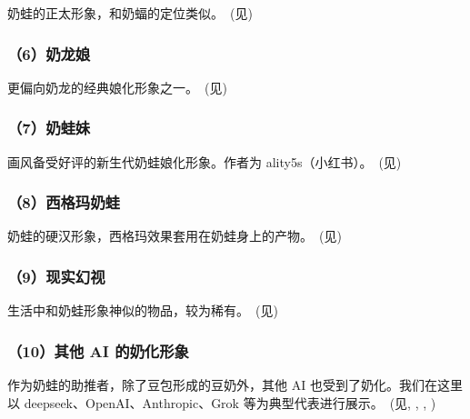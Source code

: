 奶蛙的正太形象，和奶蝠的定位类似。~(见)

\clearpage
\subsubsection{（6）奶龙娘}



更偏向奶龙的经典娘化形象之一。~(见)

\subsubsection{（7）奶蛙妹}



画风备受好评的新生代奶蛙娘化形象。作者为 ality5s（小红书）。~(见)

\subsubsection{（8）西格玛奶蛙}



奶蛙的硬汉形象，西格玛效果套用在奶蛙身上的产物。~(见)

\clearpage
\subsubsection{（9）现实幻视}

生活中和奶蛙形象神似的物品，较为稀有。~(见)



\subsubsection{（10）其他 AI 的奶化形象}

作为奶蛙的助推者，除了豆包形成的豆奶外，其他 AI 也受到了奶化。我们在这里以 deepseek、OpenAI、Anthropic、Grok 等为典型代表进行展示。~(见, , , )







\clearpage


